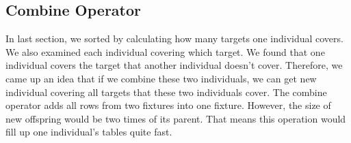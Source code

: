 \subsection{Combine Operator}

In last section, we sorted by calculating how many targets one individual covers. We also examined each individual covering which target. We found that one individual covers the target that another individual doesn’t cover. Therefore, we came up an idea that if we combine these two individuals, we can get new individual covering all targets that these two individuals cover. The combine operator adds all rows from two fixtures into one fixture. However, the size of new offspring would be two times of its parent. That means this operation would fill up one individual’s tables quite fast.

